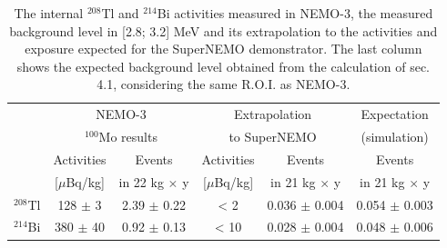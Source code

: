 \documentclass[main.tex]{subfiles}
\begin{document}
\begin{table}[h!]
\centering
\begin{tabular}{c|c|c|c|c|c}
\toprule
 & \multicolumn{2}{c|}{NEMO-3}                    & \multicolumn{2}{c|}{Extrapolation} & Expectation         \\ [0.1cm]
 & \multicolumn{2}{c|}{$^{\text{100}}$Mo results} & \multicolumn{2}{c|}{to SuperNEMO}  & (simulation)        \\ [0.1cm]
\hline
 & Activities   & Events                          & Activities   & Events              & Events              \\ [0.1cm]
 & [$\mu$Bq/kg] & in 22 kg $\times$ y             & [$\mu$Bq/kg] & in 21 kg $\times$ y & in 21 kg $\times$ y \\ [0.1cm]
\hline
$^{\text{208}}$Tl & 128 $\pm$ 3 & 2.39 $\pm$ 0.22 & < 2 & 0.036 $\pm$ 0.004 & 0.054 $\pm$ 0.003 \\ [0.1cm]
$^{\text{214}}$Bi & 380 $\pm$ 40& 0.92 $\pm$ 0.13 & < 10& 0.028 $\pm$ 0.004 & 0.048 $\pm$ 0.006 \\ [0.1cm]
\bottomrule
\end{tabular}
\caption{The internal $^{\text{208}}$Tl and $^{\text{214}}$Bi activities measured in NEMO-3, the measured background level in [2.8; 3.2] MeV and its extrapolation to the activities and exposure expected for the SuperNEMO demonstrator. The last column shows the expected background level obtained from the calculation of sec. 4.1, considering the same R.O.I. as NEMO-3.}
\label{tab:ExtrapolationBackground}
\end{table}


\FloatBarrier








\end{document}
